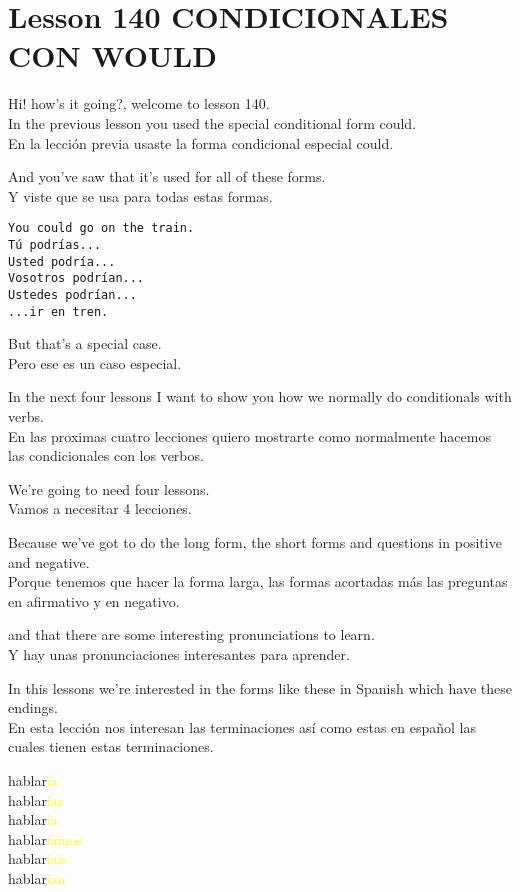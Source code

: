\section{Lesson 140 CONDICIONALES CON WOULD}

Hi! how's it going?, welcome to lesson 140.\\

In the previous lesson you used the special conditional form
could.\\
En la lección previa usaste la forma condicional especial could.

And you've saw that it's used for all of these forms.\\
Y viste que se usa para todas estas formas.

\begin{verbatim}
You could go on the train.
Tú podrías...
Usted podría...
Vosotros podrían...
Ustedes podrían...
...ir en tren.
\end{verbatim}

But that's a special case.\\
Pero ese es un caso especial.

In the next four lessons I want to show you how we
normally do conditionals with verbs.\\
En las proximas cuatro lecciones quiero mostrarte como normalmente hacemos
las condicionales con los verbos.

We're going to need four lessons.\\
Vamos a necesitar 4 lecciones.

Because we've got to do the long form, the short forms and questions in
positive and negative.\\
Porque tenemos que hacer la forma larga, las formas acortadas más las
preguntas en afirmativo y en negativo.

and that there are some interesting pronunciations to learn.\\
Y hay unas pronunciaciones interesantes para aprender.

In this lessons we're interested in the forms like these in Spanish which
have these endings.\\
En esta lección nos interesan las terminaciones así como estas en español
las cuales tienen estas terminaciones.

hablar\textcolor{yellow}{ía}\\
hablar\textcolor{yellow}{ías}\\
hablar\textcolor{yellow}{ía}\\
hablar\textcolor{yellow}{íamos}\\
hablar\textcolor{yellow}{íais}\\
hablar\textcolor{yellow}{ían}\\

